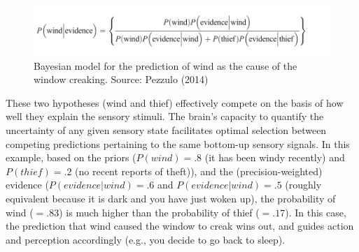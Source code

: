 \begin{CJK}{UTF8}{gbsn}
      \begin{figure}[htbp]
      \begin{center}
      \includegraphics[scale=.5]{images/windThief.png}
        \caption{Bayesian model for the prediction of wind as the cause of the window creaking. Source: Pezzulo (2014)}
          \label{fig:windThief}
      \end{center}
      \end{figure}

These two hypotheses (wind and thief) effectively compete on the basis of how well they explain the sensory stimuli.  The brain's capacity to quantify the uncertainty of any given sensory state facilitates optimal selection between competing predictions pertaining to the same bottom-up sensory signals.  In this example, based on the priors ($P(wind) = .8$ (it has been windy recently) and $P(thief) = .2$ (no recent reports of theft)), and the (precision-weighted) evidence ($P(evidence|wind) = .6$ and $P(evidence|wind) = .5$ (roughly equivalent because it is dark and you have just woken up), the probability of wind ($= .83$) is much higher than the probability of thief ($= .17$).  In this case, the prediction that wind caused the window to creak wins out, and guides action and perception accordingly (e.g., you decide to go back to sleep).


\end{CJK}
